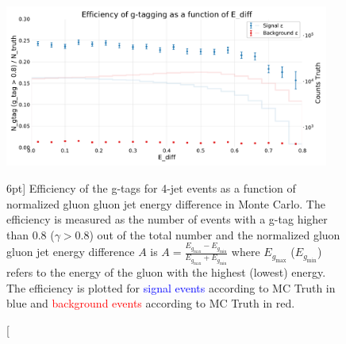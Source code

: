 \documentclass[a4paper, twoside]{tufte-book}
\begin{document}
\begin{figure}
  \includegraphics[width=0.95\textwidth, trim=0 0 0 40, clip, page=1]{figures/quarks/efficiency_events-down_sample=1.00-ML_vars=vertex-selection=b-ejet_min=4-n_iter_RS_lgb=99-n_iter_RS_xgb=9-cdot_cut=0.90-version=19-njet=4.pdf}
  \caption[g-Tagging efficiency for 4-jet events in MC as a function of normalized gluon gluon jet energy difference][6pt]
          {Efficiency of the g-tags for 4-jet events as a function of normalized gluon gluon jet energy difference in Monte Carlo. The efficiency is measured as the number of events with a g-tag higher than 0.8 ($\gamma > 0.8$) out of the total number and the normalized gluon gluon jet energy difference $A$ is $A=\frac{E_{g_\mathrm{max}}-E_{g_\mathrm{min}}}{E_{g_\mathrm{max}}+E_{g_\mathrm{min}}}$ where $E_{g_\mathrm{max}}$ ($E_{g_\mathrm{min}}$) refers to the energy of the gluon with the highest (lowest) energy. The efficiency is plotted for \textcolor{blue}{signal events} according to MC Truth in blue and \textcolor{red}{background events} according to MC Truth in red.
          } 
  \label{fig:q:effiency_gtag_E_diff}
\end{figure}
\end{document}
